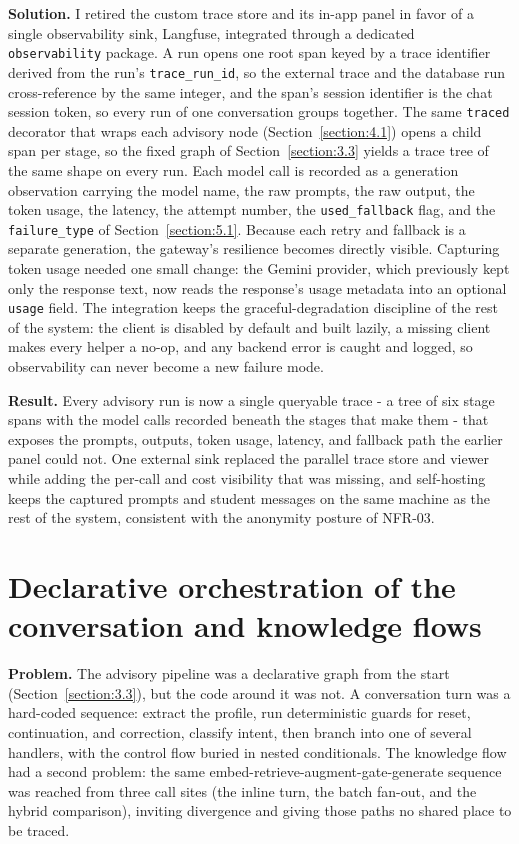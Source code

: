 \documentclass[../main.tex]{subfiles}
\begin{document}
\textbf{Solution.}
I retired the custom trace store and its in-app panel in favor of a single observability sink, Langfuse, integrated through a dedicated \texttt{observability} package.
A run opens one root span keyed by a trace identifier derived from the run's \texttt{trace\_run\_id}, so the external trace and the database run cross-reference by the same integer, and the span's session identifier is the chat session token, so every run of one conversation groups together.
The same \texttt{traced} decorator that wraps each advisory node (Section~\ref{section:4.1}) opens a child span per stage, so the fixed graph of Section~\ref{section:3.3} yields a trace tree of the same shape on every run.
Each model call is recorded as a generation observation carrying the model name, the raw prompts, the raw output, the token usage, the latency, the attempt number, the \texttt{used\_fallback} flag, and the \texttt{failure\_type} of Section~\ref{section:5.1}.
Because each retry and fallback is a separate generation, the gateway's resilience becomes directly visible.
Capturing token usage needed one small change: the Gemini provider, which previously kept only the response text, now reads the response's usage metadata into an optional \texttt{usage} field.
The integration keeps the graceful-degradation discipline of the rest of the system: the client is disabled by default and built lazily, a missing client makes every helper a no-op, and any backend error is caught and logged, so observability can never become a new failure mode.

\textbf{Result.}
Every advisory run is now a single queryable trace - a tree of six stage spans with the model calls recorded beneath the stages that make them - that exposes the prompts, outputs, token usage, latency, and fallback path the earlier panel could not.
One external sink replaced the parallel trace store and viewer while adding the per-call and cost visibility that was missing, and self-hosting keeps the captured prompts and student messages on the same machine as the rest of the system, consistent with the anonymity posture of NFR-03.

\section{Declarative orchestration of the conversation and knowledge flows}
\label{section:5.4}

\textbf{Problem.}
The advisory pipeline was a declarative graph from the start (Section~\ref{section:3.3}), but the code around it was not.
A conversation turn was a hard-coded sequence: extract the profile, run deterministic guards for reset, continuation, and correction, classify intent, then branch into one of several handlers, with the control flow buried in nested conditionals.
The knowledge flow had a second problem: the same embed-retrieve-augment-gate-generate sequence was reached from three call sites (the inline turn, the batch fan-out, and the hybrid comparison), inviting divergence and giving those paths no shared place to be traced.
\end{document}
